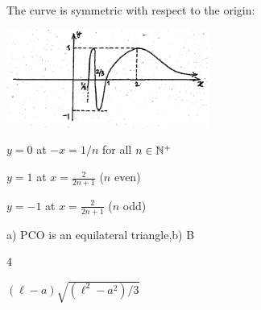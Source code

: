\documentclass[11pt]{amsbook}
\begin{document}
\begin{hEnumerateArabic}
\item The curve is symmetric with respect to the origin:
\begin{center}
	\includegraphics[width=0.5\textwidth]{images/b1p1-231-fig05}
\end{center}

\quad\quad\quad $y = 0$ at $-x = 1/n$ for all $n \in \mathbb{N}^{+}$

\quad\quad\quad $y = 1$ at $x = \frac{2}{2n+1}$ ($n$ even)

\quad\quad\quad $y = {-1}$ at $x = \frac{2}{2n+1}$ ($n$ odd)
\\

\item a) PCO is an equilateral triangle,\quad b) B 
\\

\item 4 
\\

\item $\left(\ell-a\right)\sqrt{\left(\ell^2-a^2\right)/3}$ 
\\

\end{hEnumerateArabic}
\end{document}
